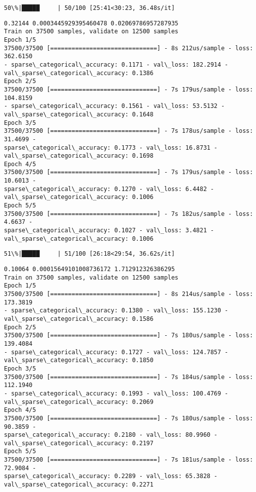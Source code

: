 \documentclass[11pt]{article}
\begin{document}
    \begin{Verbatim}[commandchars=\\\{\}]
 50\%|█████     | 50/100 [25:41<30:23, 36.48s/it]
    \end{Verbatim}

    \begin{Verbatim}[commandchars=\\\{\}]
0.32144 0.0003445929395460478 0.02069786957287935
Train on 37500 samples, validate on 12500 samples
Epoch 1/5
37500/37500 [==============================] - 8s 212us/sample - loss: 362.6150
- sparse\_categorical\_accuracy: 0.1171 - val\_loss: 182.2914 -
val\_sparse\_categorical\_accuracy: 0.1386
Epoch 2/5
37500/37500 [==============================] - 7s 179us/sample - loss: 104.8159
- sparse\_categorical\_accuracy: 0.1561 - val\_loss: 53.5132 -
val\_sparse\_categorical\_accuracy: 0.1648
Epoch 3/5
37500/37500 [==============================] - 7s 178us/sample - loss: 31.4699 -
sparse\_categorical\_accuracy: 0.1773 - val\_loss: 16.8731 -
val\_sparse\_categorical\_accuracy: 0.1698
Epoch 4/5
37500/37500 [==============================] - 7s 179us/sample - loss: 10.6013 -
sparse\_categorical\_accuracy: 0.1270 - val\_loss: 6.4482 -
val\_sparse\_categorical\_accuracy: 0.1006
Epoch 5/5
37500/37500 [==============================] - 7s 182us/sample - loss: 4.6637 -
sparse\_categorical\_accuracy: 0.1027 - val\_loss: 3.4821 -
val\_sparse\_categorical\_accuracy: 0.1006
    \end{Verbatim}

    \begin{Verbatim}[commandchars=\\\{\}]
 51\%|█████     | 51/100 [26:18<29:54, 36.62s/it]
    \end{Verbatim}

    \begin{Verbatim}[commandchars=\\\{\}]
0.10064 0.00015649101008736172 1.712912326386295
Train on 37500 samples, validate on 12500 samples
Epoch 1/5
37500/37500 [==============================] - 8s 214us/sample - loss: 173.3819
- sparse\_categorical\_accuracy: 0.1380 - val\_loss: 155.1230 -
val\_sparse\_categorical\_accuracy: 0.1586
Epoch 2/5
37500/37500 [==============================] - 7s 180us/sample - loss: 139.4084
- sparse\_categorical\_accuracy: 0.1727 - val\_loss: 124.7857 -
val\_sparse\_categorical\_accuracy: 0.1850
Epoch 3/5
37500/37500 [==============================] - 7s 184us/sample - loss: 112.1940
- sparse\_categorical\_accuracy: 0.1993 - val\_loss: 100.4769 -
val\_sparse\_categorical\_accuracy: 0.2069
Epoch 4/5
37500/37500 [==============================] - 7s 180us/sample - loss: 90.3859 -
sparse\_categorical\_accuracy: 0.2180 - val\_loss: 80.9960 -
val\_sparse\_categorical\_accuracy: 0.2197
Epoch 5/5
37500/37500 [==============================] - 7s 181us/sample - loss: 72.9084 -
sparse\_categorical\_accuracy: 0.2289 - val\_loss: 65.3828 -
val\_sparse\_categorical\_accuracy: 0.2271
    \end{Verbatim}
\end{document}
